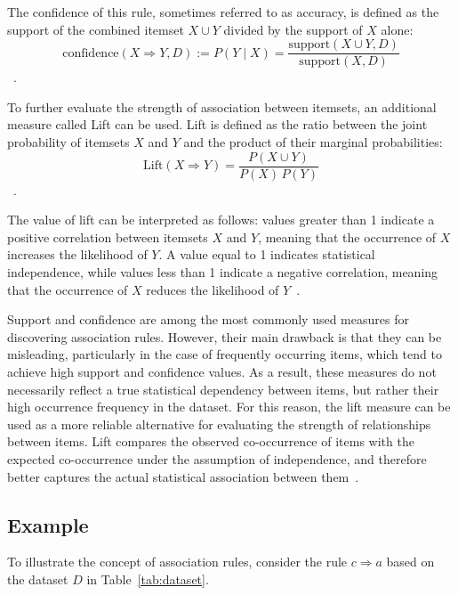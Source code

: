 The confidence of this rule, sometimes referred to as accuracy, is defined as the support of the combined itemset $X \cup Y$ divided by the support of $X$ alone:
\[
\text{confidence}(X \Rightarrow Y, D) := P(Y \mid X) = \frac{\text{support}(X \cup Y, D)}{\text{support}(X, D)}
\]
~\parencite{Goethals2003}.

To further evaluate the strength of association between itemsets, an additional measure called Lift can be used. Lift is defined as the ratio between the joint probability of itemsets $X$ and $Y$ and the product of their marginal probabilities:
\[
\text{Lift}(X \Rightarrow Y) = \frac{P(X \cup Y)}{P(X)\,P(Y)}
\]
~\parencite{hussein2015using}.

The value of lift can be interpreted as follows: values greater than 1 indicate a positive correlation between itemsets $X$ and $Y$, meaning that the occurrence of $X$ increases the likelihood of $Y$. A value equal to 1 indicates statistical independence, while values less than 1 indicate a negative correlation, meaning that the occurrence of $X$ reduces the likelihood of $Y$~\parencite{Han2012}.

Support and confidence are among the most commonly used measures for discovering association rules. However, their main drawback is that they can be misleading, particularly in the case of frequently occurring items, which tend to achieve high support and confidence values. As a result, these measures do not necessarily reflect a true statistical dependency between items, but rather their high occurrence frequency in the dataset. For this reason, the lift measure can be used as a more reliable alternative for evaluating the strength of relationships between items. Lift compares the observed co-occurrence of items with the expected co-occurrence under the assumption of independence, and therefore better captures the actual statistical association between them~\parencite{hussein2015using}. 

\subsection{Example}

To illustrate the concept of association rules, consider the rule $c \Rightarrow a$ based on the dataset $D$ in Table~\ref{tab:dataset}.

